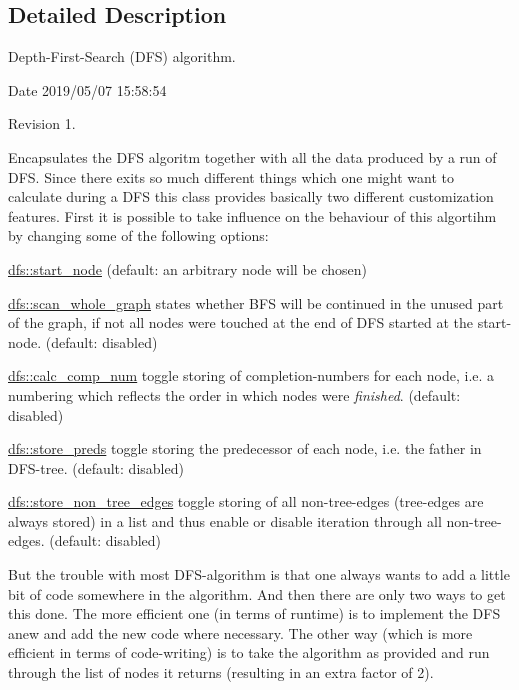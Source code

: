 \subsection{Detailed Description}
Depth-\/\+First-\/\+Search (D\+FS) algorithm. 

\begin{DoxyParagraph}{Date}
2019/05/07 15\+:58\+:54 
\end{DoxyParagraph}
\begin{DoxyParagraph}{Revision}
1. 
\end{DoxyParagraph}


Encapsulates the D\+FS algoritm together with all the data produced by a run of D\+FS. Since there exits so much different things which one might want to calculate during a D\+FS this class provides basically two different customization features. First it is possible to take influence on the behaviour of this algortihm by changing some of the following options\+:
\begin{DoxyItemize}
\item \mbox{\hyperlink{classdfs_aad21fd0d3036350fd341f877d5747852}{dfs\+::start\+\_\+node}} (default\+: an arbitrary node will be chosen)
\item \mbox{\hyperlink{classdfs_aa7c864a6f3a120720138b187b3ed95b5}{dfs\+::scan\+\_\+whole\+\_\+graph}} states whether B\+FS will be continued in the unused part of the graph, if not all nodes were touched at the end of D\+FS started at the start-\/node. (default\+: disabled)
\item \mbox{\hyperlink{classdfs_a70862ea715c52eb95fb704afd3a6e676}{dfs\+::calc\+\_\+comp\+\_\+num}} toggle storing of completion-\/numbers for each node, i.\+e. a numbering which reflects the order in which nodes were {\itshape finished}. (default\+: disabled)
\item \mbox{\hyperlink{classdfs_a7043f46eb3887cbcbb1391fc783407a4}{dfs\+::store\+\_\+preds}} toggle storing the predecessor of each node, i.\+e. the father in D\+F\+S-\/tree. (default\+: disabled)
\item \mbox{\hyperlink{classdfs_a6f54f1c4339eacc8961e795439d4593d}{dfs\+::store\+\_\+non\+\_\+tree\+\_\+edges}} toggle storing of all non-\/tree-\/edges (tree-\/edges are always stored) in a list and thus enable or disable iteration through all non-\/tree-\/edges. (default\+: disabled)
\end{DoxyItemize}

But the trouble with most D\+F\+S-\/algorithm is that one always wants to add a little bit of code somewhere in the algorithm. And then there are only two ways to get this done. The more efficient one (in terms of runtime) is to implement the D\+FS anew and add the new code where necessary. The other way (which is more efficient in terms of code-\/writing) is to take the algorithm as provided and run through the list of nodes it returns (resulting in an extra factor of 2).

